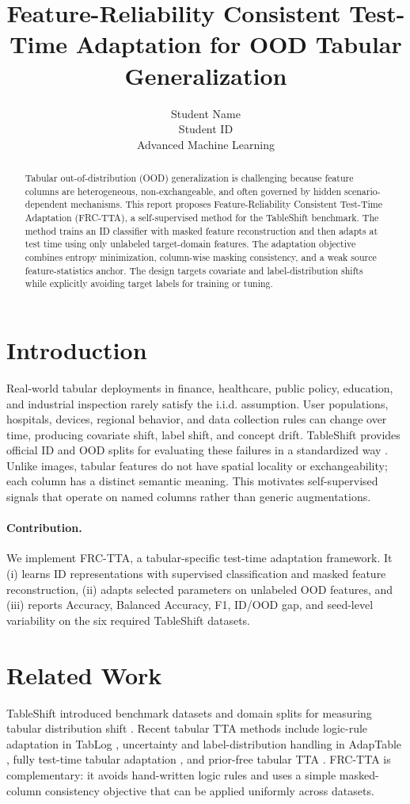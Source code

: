 \IfFileExists{neurips_2025.sty}{\documentclass{article}\usepackage[preprint]{neurips_2025}}{\documentclass[11pt]{article}\usepackage[margin=1in]{geometry}}
\title{Feature-Reliability Consistent Test-Time Adaptation for OOD Tabular Generalization}
\author{Student Name \\ Student ID \\ Advanced Machine Learning}
\begin{document}
\maketitle
\begin{abstract}
Tabular out-of-distribution (OOD) generalization is challenging because feature columns are heterogeneous, non-exchangeable, and often governed by hidden scenario-dependent mechanisms. This report proposes Feature-Reliability Consistent Test-Time Adaptation (FRC-TTA), a self-supervised method for the TableShift benchmark. The method trains an ID classifier with masked feature reconstruction and then adapts at test time using only unlabeled target-domain features. The adaptation objective combines entropy minimization, column-wise masking consistency, and a weak source feature-statistics anchor. The design targets covariate and label-distribution shifts while explicitly avoiding target labels for training or tuning.
\end{abstract}

\section{Introduction}
Real-world tabular deployments in finance, healthcare, public policy, education, and industrial inspection rarely satisfy the i.i.d. assumption. User populations, hospitals, devices, regional behavior, and data collection rules can change over time, producing covariate shift, label shift, and concept drift. TableShift provides official ID and OOD splits for evaluating these failures in a standardized way \citep{gardner2023tableshift}. Unlike images, tabular features do not have spatial locality or exchangeability; each column has a distinct semantic meaning. This motivates self-supervised signals that operate on named columns rather than generic augmentations.

\paragraph{Contribution.} We implement FRC-TTA, a tabular-specific test-time adaptation framework. It (i) learns ID representations with supervised classification and masked feature reconstruction, (ii) adapts selected parameters on unlabeled OOD features, and (iii) reports Accuracy, Balanced Accuracy, F1, ID/OOD gap, and seed-level variability on the six required TableShift datasets.

\section{Related Work}
TableShift introduced benchmark datasets and domain splits for measuring tabular distribution shift \citep{gardner2023tableshift}. Recent tabular TTA methods include logic-rule adaptation in TabLog \citep{ren2024tablog}, uncertainty and label-distribution handling in AdapTable \citep{kim2024adaptable}, fully test-time tabular adaptation \citep{zhou2024fully}, and prior-free tabular TTA \citep{he2026priorfree}. FRC-TTA is complementary: it avoids hand-written logic rules and uses a simple masked-column consistency objective that can be applied uniformly across datasets.
\end{document}
